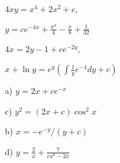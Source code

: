 \documentclass[11pt]{amsbook}
\begin{document}
\begin{hEnumerateArabic}
\item
  \begin{multicols}{2}
    \begin{hEnumerateAlpha}
      \item $4xy = x^4 + 2x^2 + c$,
      \item $y = ce^{-4x} + \frac{x^4}{4} - \frac{x}{8} + \frac{1}{32}$
    \end{hEnumerateAlpha}
  \end{multicols}

\item
  \begin{multicols}{2}
    \begin{hEnumerateAlpha}
      \item $4x = 2y - 1 + ce^{-2y}$,
      \item $x + \ln y = e^y (\int\frac{1}{y}e^{-4}dy + c)$
    \end{hEnumerateAlpha}
  \end{multicols}

\item
  \begin{multicols}{2}
    \begin{hEnumerateAlpha}
      \item[a)] $y = 2x + ce^{-x}$
      \item[c)] $y^2 = (2x + c)\cos^2x$
      \item[b)] $x = -e^{-y}/(y + c)$
      \item[d)] $y = \frac{2}{x} + \frac{7}{cx^8 - 2x}$
    \end{hEnumerateAlpha}
  \end{multicols}

\end{hEnumerateArabic}
\end{document}
